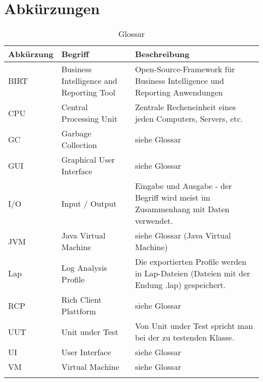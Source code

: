 \chapter*{Abkürzungen}\label{abkuerzungen}
  \begin{longtable}{|p{3cm}|p{5cm}|p{6.5cm}|}
\hline
  \textbf{Abkürzung} &\textbf{Begriff} &  \textbf{Beschreibung} \\\hline
BIRT & Business Intelligence and Reporting Tool & Open-Source-Framework für Business Intelligence und Reporting Anwendungen \\\hline
CPU & Central Processing Unit & Zentrale Recheneinheit eines jeden Computers, Servers, etc. \\\hline
GC & Garbage Collection & siehe Glossar \\\hline
GUI & Graphical User Interface & siehe Glossar\\\hline
I/O & Input / Output & Eingabe und Ausgabe - der Begriff wird meist im Zusammenhang mit Daten verwendet.\\\hline
JVM & Java Virtual Machine & siehe Glossar (Java Virtual Machine)\\\hline
Lap & Log Analysis Profile & Die exportierten Profile werden in Lap-Dateien (Dateien mit der Endung .lap) gespeichert.\\\hline
RCP & Rich Client Plattform &siehe Glossar\\\hline
UUT & Unit under Test & Von Unit under Test spricht man bei der zu testenden Klasse.\\\hline
UI & User Interface & siehe Glossar \\\hline
VM & Virtual Machine &  siehe Glossar\\\hline
      \caption{Glossar}\\
  \end{longtable}



